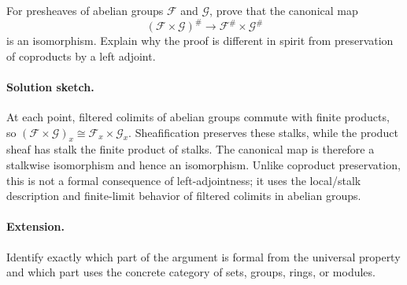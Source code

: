 \begin{problem}
For presheaves of abelian groups $\mathcal F$ and $\mathcal G$, prove that the canonical map
\[
(\mathcal F\times\mathcal G)^\#\longrightarrow\mathcal F^\#\times\mathcal G^\#
\]
is an isomorphism. Explain why the proof is different in spirit from preservation of coproducts by a left adjoint.
\end{problem}
\ifdefined\FullProblemDossiers
\paragraph{Solution sketch.}
At each point, filtered colimits of abelian groups commute with finite products, so $(\mathcal F\times\mathcal G)_x\cong\mathcal F_x\times\mathcal G_x$. Sheafification preserves these stalks, while the product sheaf has stalk the finite product of stalks. The canonical map is therefore a stalkwise isomorphism and hence an isomorphism. Unlike coproduct preservation, this is not a formal consequence of left-adjointness; it uses the local/stalk description and finite-limit behavior of filtered colimits in abelian groups.
\paragraph{Extension.}
Identify exactly which part of the argument is formal from the universal property and which part uses the concrete category of sets, groups, rings, or modules.
\fi
